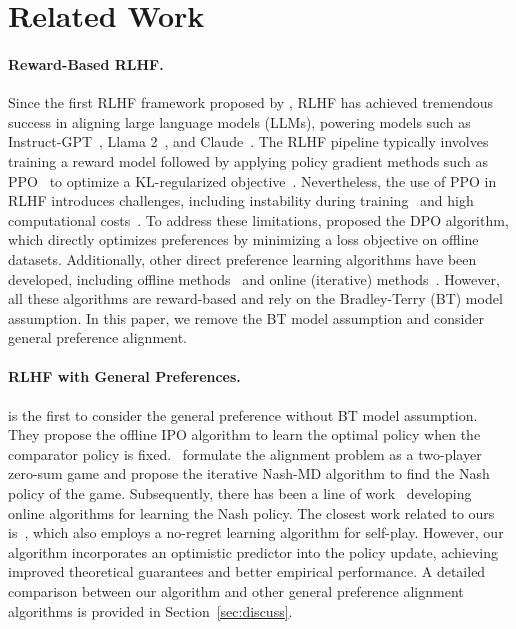 \section{Related Work}\label{sec:related}
\paragraph{Reward-Based RLHF.} Since the first RLHF framework proposed by \citet{christiano2017deep}, RLHF has achieved tremendous success in aligning large language models (LLMs), powering models such as Instruct-GPT~\citep{ouyang2022training}, Llama 2~\citep{touvron2023llama}, and Claude~\citep{bai2022training}. The RLHF pipeline typically involves training a reward model followed by applying policy gradient methods such as PPO~\citep{schulman2017proximal} to optimize a KL-regularized objective~\citep{korbak2022rl,li2023remax}. Nevertheless, the use of PPO in RLHF introduces challenges, including instability during training~\citep{choshen2019weaknesses} and high computational costs~\citep{yuan2023rrhf}. To address these limitations, \citet{rafailov2024direct} proposed the DPO algorithm, which directly optimizes preferences by minimizing a loss objective on offline datasets. Additionally, other direct preference learning algorithms have been developed, including offline methods~\citep{ethayarajh2024kto} and online (iterative) methods~\citep{xie2024exploratory,xiong2024iterative,yuan2024self}. However, all these algorithms are reward-based and rely on the Bradley-Terry (BT) model assumption. In this paper, we remove the BT model assumption and consider general preference alignment.


\paragraph{RLHF with General Preferences.}\citet{azar2024general} is the first to consider the general preference without BT model assumption. They propose the offline IPO algorithm to learn the optimal policy when the comparator policy is fixed.~\citet{munos2023nash} formulate the alignment problem as a two-player zero-sum game and propose the iterative Nash-MD algorithm to find the Nash policy of the game. Subsequently, there has been a line of work~\citep{ye2024theoretical,calandriello2024human,rosset2024direct,wu2024self} developing online algorithms for learning the Nash policy. The closest work related to ours is~\citet{zhang2024iterative}, which also employs a no-regret learning algorithm for self-play. However, our algorithm incorporates an optimistic predictor into the policy update, achieving improved theoretical guarantees and better empirical performance. A detailed comparison between our algorithm and other general preference alignment algorithms is provided in Section~\ref{sec:discuss}.

